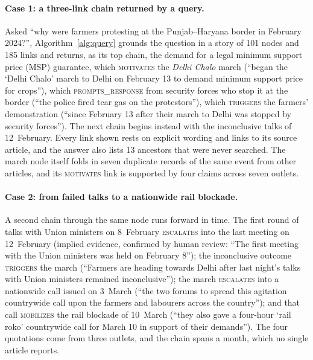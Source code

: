 \documentclass[pdflatex,sn-basic,lineno]{sn-jnl}
\theoremstyle{thmstylethree}
\theoremstyle{thmstyleone}
\newcommand{\rel}[1]{\textsc{#1}}
\begin{document}
\paragraph{Case 1: a three-link chain returned by a query.} Asked ``why were farmers protesting at the Punjab--Haryana border
in February 2024?'', Algorithm~\ref{alg:query} grounds the question in a story of 101 nodes and 185
links and returns, as its top chain, the demand for a legal minimum support price (MSP) guarantee,
which \rel{motivates} the \emph{Delhi Chalo} march (``began the `Delhi Chalo' march to Delhi on
February 13 to demand minimum support price for crops''), which \rel{prompts\_response} from
security forces who stop it at the border (``the police fired tear gas on the protestors''), which
\rel{triggers} the farmers' demonstration (``since February 13 after their march to Delhi was
stopped by security forces''). The next chain begins instead with the inconclusive talks of
12~February. Every link shown rests on explicit wording and links to its source article, and the
answer also lists 13 ancestors that were never searched. The march node itself folds in seven
duplicate records of the same event from other articles, and its \rel{motivates} link is supported by
four claims across seven outlets.

\paragraph{Case 2: from failed talks to a nationwide rail blockade.} A second chain through the
same node runs forward in time. The first round of talks with Union ministers on 8~February
\rel{escalates} into the last meeting on 12~February (implied evidence, confirmed by human
review: ``The first meeting with the Union ministers was held on February 8''); the
inconclusive outcome \rel{triggers} the march (``Farmers are heading towards Delhi after last
night's talks with Union ministers remained inconclusive''); the march \rel{escalates} into a
nationwide call issued on 3~March (``the two forums to spread this agitation countrywide call upon
the farmers and labourers across the country''); and that call \rel{mobilizes} the rail blockade
of 10~March (``they also gave a four-hour `rail roko' countrywide call for March 10 in support of
their demands''). The four quotations come from three outlets, and the chain spans a month, which no
single article reports.
\end{document}
